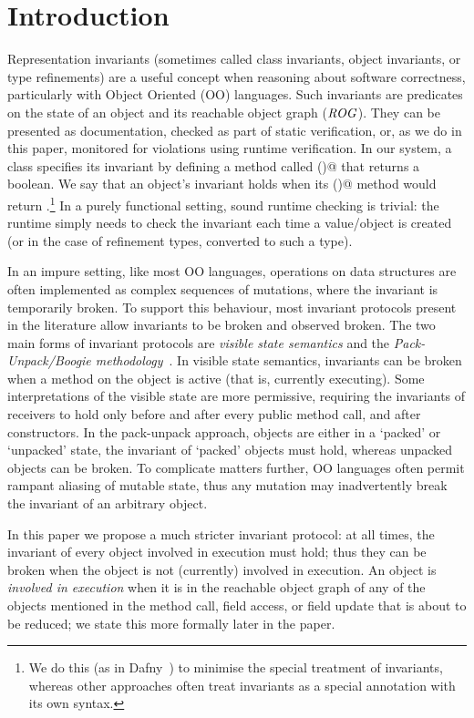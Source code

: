 \section{Introduction}
\label{s:intro}
Representation invariants (sometimes called class invariants, object invariants, or type refinements) are
a useful concept when reasoning about software correctness, particularly with Object Oriented (OO) languages. Such invariants are predicates on the state of an object and its  reachable object graph ($\mathit{ROG}$).
They can be presented as documentation, checked as part of static verification, or, as we do in this paper, monitored for violations using runtime verification.
In our system, a class specifies its invariant by defining a method called \Q@invariant()@
that returns a boolean.
We say that an object's invariant holds when its \Q@invariant()@ method would return \Q@true@.\footnote{We do this (as in Dafny~\cite{DBLP:conf/sigada/Leino12}) to minimise the special treatment of invariants, whereas other approaches often treat invariants as a special annotation with its own syntax.}
In a purely functional setting, sound runtime checking is trivial: the runtime simply needs to check the invariant each time a value/object is created (or in the case of refinement types, converted to such a type).

In an impure setting, like most OO languages, 
operations on data structures are often implemented as complex sequences of mutations,
where the invariant is temporarily broken.
To support this behaviour, most invariant protocols present in the literature allow invariants to be broken and observed broken.
The two main forms of invariant protocols are \emph{visible state semantics} \cite{Meyer:1988:OSC:534929} and the \emph{Pack-Unpack/Boogie methodology}~\cite{DBLP:journals/jot/BarnettDFLS04}.
In visible state semantics, invariants can be broken when a method on the object is active (that is, currently executing).
Some interpretations of the visible state are more permissive, requiring the invariants of receivers to hold only before and after every public method call, and after constructors. 
In the pack-unpack approach, objects are either in a `packed' or `unpacked' state, 
the invariant of `packed' objects must hold, whereas unpacked objects can be broken.
To complicate matters further, OO languages often permit rampant aliasing of mutable state, thus any mutation may inadvertently break the invariant of an arbitrary object.

In this paper we propose a much stricter invariant protocol: at all times, the invariant of every object involved in execution must hold; thus they can be broken when the object is not (currently) involved in execution. 
An object is \emph{involved in execution} when it is in the reachable object graph of any of the objects mentioned in the method call, field access, or field update that is about to be reduced; we state this more formally later in the paper.

